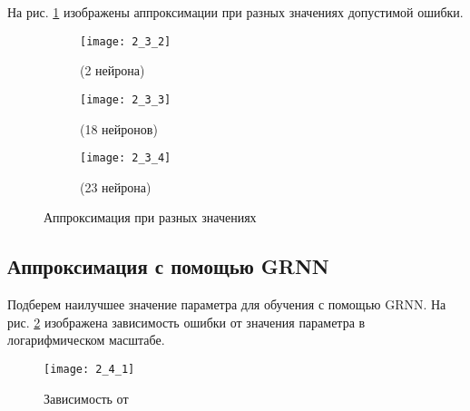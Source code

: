 На рис. \ref{fig:2_3_2} изображены аппроксимации при разных значениях допустимой ошибки.
\begin{figure}[H]
\begin{center}
	\begin{subfigure}{0.49\textwidth}
		\texttt{[image: 2\_3\_2]}
		\caption{ (2 нейрона)}
	\end{subfigure}
	\begin{subfigure}{0.49\textwidth}
		\texttt{[image: 2\_3\_3]}
		\caption{ (18 нейронов)}
	\end{subfigure}
	\begin{subfigure}{0.49\textwidth}
		\texttt{[image: 2\_3\_4]}
		\caption{ (23 нейрона)}
	\end{subfigure}
	\caption{Аппроксимация при разных значениях }
	\label{fig:2_3_2}
\end{center}
\end{figure}

\subsection{Аппроксимация с помощью GRNN}


Подберем наилучшее значение параметра  для обучения с помощью GRNN. На рис. \ref{fig:2_4_1} изображена зависимость ошибки  от значения параметра  в логарифмическом масштабе. 
\begin{figure}[H]
\begin{center}
	\texttt{[image: 2\_4\_1]}
	\caption{Зависимость  от }
	\label{fig:2_4_1}
\end{center}
\end{figure}

